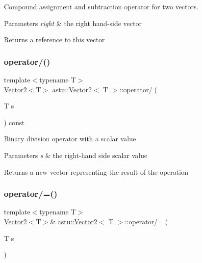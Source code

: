 Compound assignment and subtraction operator for two vectors.


\begin{DoxyParams}{Parameters}
{\em right} & the right hand-\/side vector \\
\hline
\end{DoxyParams}
\begin{DoxyReturn}{Returns}
a reference to this vector 
\end{DoxyReturn}
\mbox{\label{classastu_1_1Vector2_af2852a5bb5295f1a510e507bc554863d}} 
\subsubsection{\texorpdfstring{operator/()}{operator/()}}
{\footnotesize\ttfamily template$<$typename T$>$ \\
\hyperlink{classastu_1_1Vector2}{Vector2}$<$T$>$ \hyperlink{classastu_1_1Vector2}{astu\+::\+Vector2}$<$ T $>$\+::operator/ (\begin{DoxyParamCaption}\item[{T}]{s }\end{DoxyParamCaption}) const\hspace{0.3cm}{\ttfamily [inline]}}

Binary division operator with a scalar value


\begin{DoxyParams}{Parameters}
{\em s} & the right-\/hand side scalar value \\
\hline
\end{DoxyParams}
\begin{DoxyReturn}{Returns}
a new vector representing the result of the operation 
\end{DoxyReturn}
\mbox{\label{classastu_1_1Vector2_a9f9362218a0d011032324cbc7a9a85a1}} 
\subsubsection{\texorpdfstring{operator/=()}{operator/=()}}
{\footnotesize\ttfamily template$<$typename T$>$ \\
\hyperlink{classastu_1_1Vector2}{Vector2}$<$T$>$\& \hyperlink{classastu_1_1Vector2}{astu\+::\+Vector2}$<$ T $>$\+::operator/= (\begin{DoxyParamCaption}\item[{T}]{s }\end{DoxyParamCaption})\hspace{0.3cm}{\ttfamily [inline]}}


